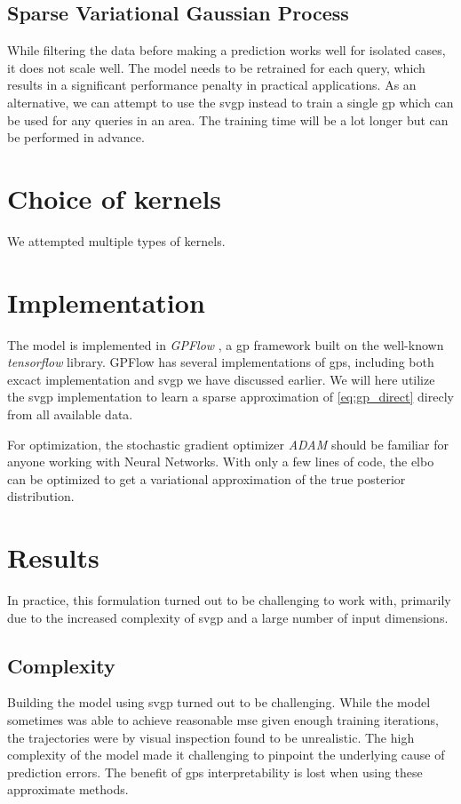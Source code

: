 \subsection{Sparse Variational Gaussian Process}
While filtering the data before making a prediction works well for isolated cases, it does not scale well. The model needs to be retrained for each query, which results in a significant performance penalty in practical applications. As an alternative, we can attempt to use the \acrshort{svgp} instead to train a single \acrshort{gp} which can be used for any queries in an area. The training time will be a lot longer but can be performed in advance. 

\section{Choice of kernels}

We attempted multiple types of kernels. 

\section{Implementation}
The model is implemented in \textit{GPFlow} \cite{GPflow2017}, a \acrshort{gp} framework built on the well-known \textit{tensorflow} \cite{tensorflow2015-whitepaper} library. GPFlow has several implementations of \acrshort{gp}s, including both excact implementation and \acrshort{svgp} we have discussed earlier. We will here utilize the \acrshort{svgp} implementation to learn a sparse approximation of \cref{eq:gp_direct} direcly from all available data. 

For optimization, the stochastic gradient optimizer \textit{ADAM} should be familiar for anyone working with Neural Networks. With only a few lines of code, the \acrshort{elbo} can be optimized to get a variational approximation of the true posterior distribution.

\section{Results}

In practice, this formulation turned out to be challenging to work with, primarily due to the increased complexity of \acrshort{svgp} and a large number of input dimensions.

\subsection{Complexity}
Building the model using \acrshort{svgp} turned out to be challenging. While the model sometimes was able to achieve reasonable \acrshort{mse} given enough training iterations, the trajectories were by visual inspection found to be unrealistic. The high complexity of the model made it challenging to pinpoint the underlying cause of prediction errors. The benefit of \acrshort{gp}s interpretability is lost when using these approximate methods.


